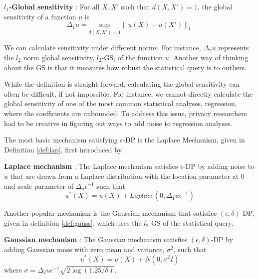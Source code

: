 \begin{defn}\label{def:gs} \textbf{$l_1$-Global sensitivity} \citep{dwork2006calibrating}:
For all $X,X'$ such that $d(X,X')=1$, the global sensitivity of a function $u$ is
    \begin{equation}\label{eqn:gs}
        \Delta_1 u= \underset{d(X,X')=1}{\text{sup}} \|u(X)-u(X') \|_1 
    \end{equation}
\end{defn}

We can calculate sensitivity under different norms. For instance, $\Delta_2 u$ represents the $l_2$ norm global sensitivity, $l_2$-GS, of the function $u$. Another way of thinking about the GS is that it measures how robust the statistical query is to outliers.

While the definition is straight forward, calculating the global sensitivity can often be difficult, if not impossible. For instance, we cannot directly calculate the global sensitivity of one of the most common statistical analyses, regression, where the coefficients are unbounded. To address this issue, privacy researchers had to be creative in figuring out ways to add noise to regression analyses.

The most basic mechanism satisfying $\epsilon$-DP is the Laplace Mechanism, given in Definition \ref{def:lap}, first introduced by \citet{dwork2006calibrating}.

\begin{defn}\textbf{Laplace mechanism} \citep{dwork2006calibrating}: \label{def:lap}
The Laplace mechanism satisfies $\epsilon$-DP by adding noise to $u$ that are drawn from a Laplace distribution with the location parameter at 0 and scale parameter of $\Delta_u\epsilon^{-1}$ such that 
    \begin{equation}\label{eqn:lap}
        u^\ast(X)=u(X)+Laplace\left(0,\Delta_1 u \epsilon^{-1}\right)
    \end{equation}
\end{defn}

Another popular mechanism is the Gaussian mechanism that satisfies $(\epsilon, \delta)$-DP, given in definition \ref{def:gauss}, which uses the $l_2$-GS of the statistical query.

\begin{defn}\label{def:gauss} \textbf{Gaussian mechanism} \citep{dwork2014algorithmic}:
    The Gaussian mechanism satisfies $(\epsilon,\delta)$-DP by adding Gaussian noise with zero mean and variance, $\sigma^2$, such that
        \begin{equation}\label{eqn:gauss}
            u^\ast(X)=u(X)+N\left(0, \sigma^2 I \right)
        \end{equation}
    where $\sigma=\Delta_2 u \epsilon^{-1} \sqrt{2 \log(1.25/\delta)}$. 
\end{defn}

